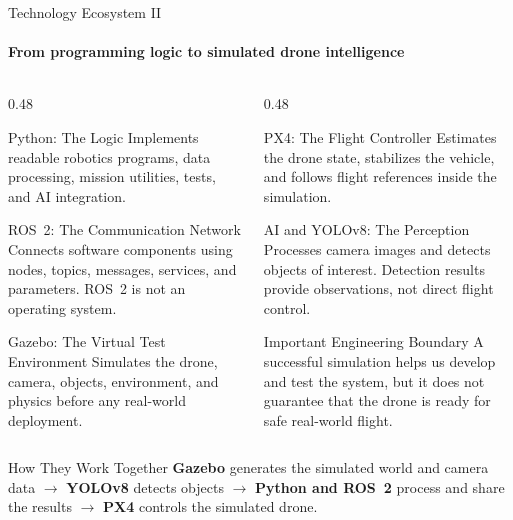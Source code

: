 \begin{frame}{Technology Ecosystem II}
\framesubtitle{From programming logic to simulated drone intelligence}

\footnotesize

\begin{columns}[T,onlytextwidth]
    \begin{column}{0.48\textwidth}
        \begin{block}{Python: The Logic}
            Implements readable robotics programs, data processing,
            mission utilities, tests, and AI integration.
        \end{block}

        \begin{block}{ROS~2: The Communication Network}
            Connects software components using nodes, topics, messages,
            services, and parameters. ROS~2 is not an operating system.
        \end{block}

        \begin{block}{Gazebo: The Virtual Test Environment}
            Simulates the drone, camera, objects, environment, and physics
            before any real-world deployment.
        \end{block}
    \end{column}
    \hfill
    \begin{column}{0.48\textwidth}
        \begin{block}{PX4: The Flight Controller}
            Estimates the drone state, stabilizes the vehicle, and follows
            flight references inside the simulation.
        \end{block}

        \begin{block}{AI and YOLOv8: The Perception}
            Processes camera images and detects objects of interest.
            Detection results provide observations, not direct flight control.
        \end{block}

        \begin{alertblock}{Important Engineering Boundary}
            A successful simulation helps us develop and test the system,
            but it does not guarantee that the drone is ready for safe
            real-world flight.
        \end{alertblock}
    \end{column}
\end{columns}

\pause

\begin{exampleblock}{How They Work Together}
    \centering
    \textbf{Gazebo} generates the simulated world and camera data
    \(\rightarrow\)
    \textbf{YOLOv8} detects objects
    \(\rightarrow\)
    \textbf{Python and ROS~2} process and share the results
    \(\rightarrow\)
    \textbf{PX4} controls the simulated drone.
\end{exampleblock}

\end{frame}
